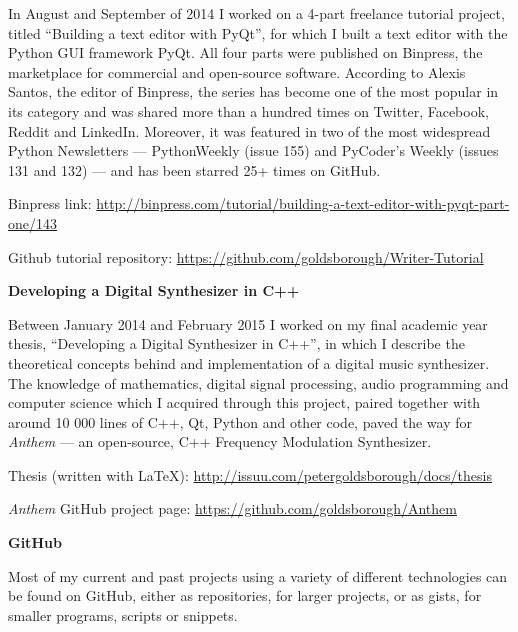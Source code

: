 \begin{body}
\begin{detail}
In August and September of 2014 I worked on a 4-part freelance tutorial project, titled ``Building a text editor with PyQt'', for which I built a text editor with the Python GUI framework PyQt. All four parts were published on Binpress, the marketplace for commercial and open-source software. According to Alexis Santos, the editor of Binpress, the series has become one of the most popular in its category and was shared more than a hundred times on Twitter, Facebook, Reddit and LinkedIn. Moreover, it was featured in two of the most widespread Python Newsletters --- PythonWeekly (issue 155) and PyCoder's Weekly (issues 131 and 132) --- and has been starred 25+ times on GitHub.

Binpress link: \href{http://binpress.com/tutorial/building-a-text-editor-with-pyqt-part-one/143}{http://binpress.com/tutorial/building-a-text-editor-with-pyqt-part-one/143}
\par
Github tutorial repository: \href{https://github.com/goldsborough/Writer-Tutorial}{https://github.com/goldsborough/Writer-Tutorial}
\end{detail}

\vspace{0.4cm}
\textbf{Developing a Digital Synthesizer in C++}

\begin{detail}
Between January 2014 and February 2015 I worked on my final academic year thesis, ``Developing a Digital Synthesizer in C++'', in which I describe the theoretical concepts behind and implementation of a digital music synthesizer. The knowledge of mathematics, digital signal processing, audio programming and computer science which I acquired through this project, paired together with around 10 000 lines of C++, Qt, Python and other code, paved the way for \emph{Anthem} --- an open-source, C++ Frequency Modulation Synthesizer.

Thesis (written with \LaTeX): \href{http://issuu.com/petergoldsborough/docs/thesis}{http://issuu.com/petergoldsborough/docs/thesis}
\par

\emph{Anthem} GitHub project page: \href{https://github.com/goldsborough/Anthem}{https://github.com/goldsborough/Anthem}
\end{detail}


\vspace{0.4cm}
\textbf{GitHub}

\begin{detail}
Most of my current and past projects using a variety of different technologies can be found on GitHub, either as repositories, for larger projects, or as gists, for smaller programs, scripts or snippets.


\end{detail}
\end{body}
